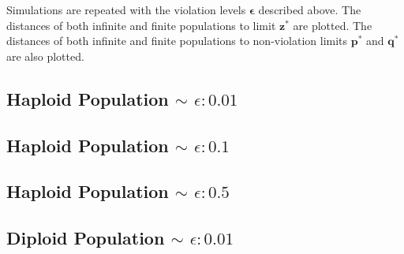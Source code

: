 % 
% 

Simulations are repeated with the violation levels $\bm{\epsilon}$ described above.
The distances of both infinite and finite populations to limit $\bm{z}^\ast$ are plotted. 
The distances of both infinite and finite populations to non-violation limits $\bm{p}^\ast$ and $\bm{q}^\ast$ are also plotted.

\clearpage
\subsection{Haploid Population $\mathtt{\sim}$ $\epsilon: 0.01$}

\subsection{Haploid Population $\mathtt{\sim}$ $\epsilon: 0.1$}

\subsection{Haploid Population $\mathtt{\sim}$ $\epsilon: 0.5$}

\clearpage
\subsection{Diploid Population $\mathtt{\sim}$ $\epsilon: 0.01$}

\clearpage
